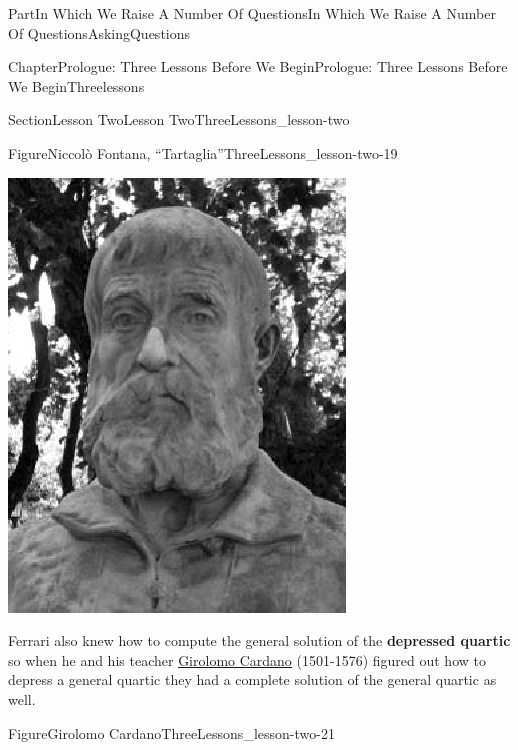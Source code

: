 \documentclass[oneside,10pt,]{book}
\newcommand{\terminology}[1]{\textbf{#1}}
\numberwithin{equation}{part}
\begin{document}
\begin{partptx}{Part}{In Which We Raise A Number Of Questions}{}{In Which We Raise A Number Of Questions}{}{}{AskingQuestions}
\begin{chapterptx}{Chapter}{Prologue: Three Lessons Before We Begin}{}{Prologue: Three Lessons Before We Begin}{}{}{Threelessons}
\begin{sectionptx}{Section}{Lesson Two}{}{Lesson Two}{}{}{ThreeLessons_lesson-two}
\begin{figureptx}{Figure}{Niccolò Fontana, ``Tartaglia''}{ThreeLessons_lesson-two-19}{}
\begin{image}{0.325}{0.35}{0.325}{}
\includegraphics[width=\linewidth]{external/images/Tartaglia.png}
\end{image}%
\tcblower
\end{figureptx}%
Ferrari also knew how to compute the general solution of the \terminology{depressed quartic} so when he and his teacher \href{https://mathshistory.st-andrews.ac.uk/Biographies/Cardan}{Girolomo Cardano} (1501-1576) figured out how to depress a general quartic they had a complete solution of the general quartic as well.%
\begin{figureptx}{Figure}{Girolomo Cardano}{ThreeLessons_lesson-two-21}{}%
%
%
\begin{image}{0.325}{0.35}{0.325}{}%

\end{image}
\end{figureptx}
\end{sectionptx}
\end{chapterptx}
\end{partptx}
\end{document}
